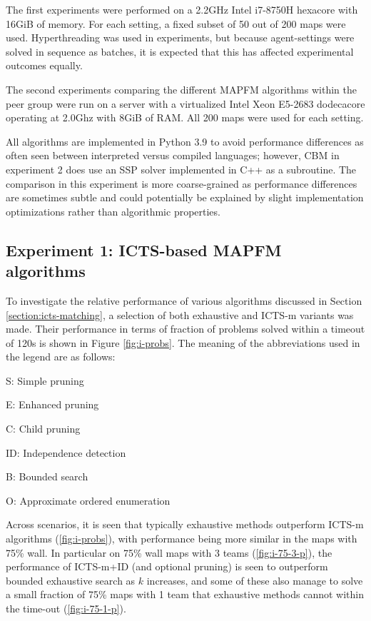 \documentclass[english]{article}
\begin{document}
	The first experiments were performed on a 2.2GHz Intel i7-8750H hexacore with 16GiB of memory. For each setting, a fixed subset of 50 out of 200 maps were used. Hyperthreading was used in experiments, but because agent-settings were solved in sequence as batches, it is expected that this has affected experimental outcomes equally.
	
	The second experiments comparing the different MAPFM algorithms within the peer group were run on a server with a virtualized Intel Xeon E5-2683 dodecacore operating at 2.0Ghz with 8GiB of RAM. All 200 maps were used for each setting.
	
	All algorithms are implemented in Python 3.9 to avoid performance differences as often seen between interpreted versus compiled languages; however, CBM\cite{baauw2021} in experiment 2 does use an SSP solver implemented in C++ as a subroutine. The comparison in this experiment is more coarse-grained as performance differences are sometimes subtle and could potentially be explained by slight implementation optimizations rather than algorithmic properties.
	
	\subsection{Experiment 1: ICTS-based MAPFM algorithms}
	To investigate the relative performance of various algorithms discussed in Section \ref{section:icts-matching}, a selection of both exhaustive and ICTS-m variants was made. Their performance in terms of fraction of problems solved within a timeout of 120s is shown in Figure \ref{fig:i-probs}. The meaning of the abbreviations used in the legend are as follows:
	\begin{itemize}
		\begin{minipage}{0.45\linewidth}
			\item S: Simple pruning
			\item E: Enhanced pruning
			\item C: Child pruning
		\end{minipage}
		\begin{minipage}{0.45\linewidth}
			\item ID: Independence detection
			\item B: Bounded search
			\item O: Approximate ordered enumeration
		\end{minipage}
	\end{itemize}
	Across scenarios, it is seen that typically exhaustive methods outperform ICTS-m algorithms (\ref{fig:i-probs}), with performance being more similar in the maps with 75\% wall. In particular on 75\% wall maps with 3 teams (\ref{fig:i-75-3-p}), the performance of ICTS-m+ID (and optional pruning) is seen to outperform bounded exhaustive search as $k$ increases, and some of these also manage to solve a small fraction of 75\% maps with 1 team that exhaustive methods cannot within the time-out (\ref{fig:i-75-1-p}).
	
\end{document}
